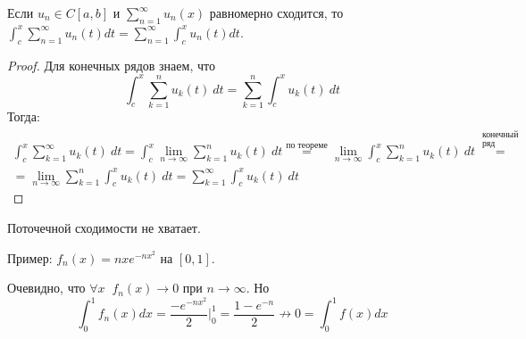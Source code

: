 \begin{follow}
    Если $u_n \in C[a, b]$ и $\sum\limits_{n=1}^\infty u_n(x)$ равномерно сходится, то $\int_c^x \sum\limits_{n=1}^\infty u_n(t) dt = \sum\limits_{n=1}^\infty \int_c^x u_n(t) dt$.
\end{follow}
\begin{proof}
  Для конечных рядов знаем, что
  \begin{equation*}
    \int_{c}^{x} \sum\limits_{k = 1}^{n} u_k(t) \: dt = \sum\limits_{k = 1}^{n} \int_{c}^{x} u_k(t) \: dt
  \end{equation*}
  Тогда:
  \begin{equation*}
    \begin{gathered}
      \int_{c}^{x} \sum\limits_{k = 1}^{\infty} u_k(t) \: dt =
      \int_{c}^{x} \lim\limits_{n \to \infty} \sum\limits_{k = 1}^{n} u_k(t) \: dt
      \overset{\text{по теореме}}{=}
      \lim\limits_{n \to \infty} \int_{c}^{x} \sum\limits_{k = 1}^{n} u_k(t) \: dt
      \overset{\substack{
        \text{конечный} \\
        \text{ряд}
      }}{=} \\
      = \lim\limits_{n \to \infty} \sum\limits_{k = 1}^{n} \int_{c}^{x} u_k(t) \: dt =
      \sum\limits_{k = 1}^{\infty} \int_{c}^{x} u_k(t) \: dt
    \end{gathered}
  \end{equation*}
\end{proof}

\begin{notice}
    Поточечной сходимости не хватает.
    
    \quad Пример: $f_n(x) = nxe^{-nx^2}$ на $[0, 1]$.

    \quad Очевидно, что $\forall x \;\; f_n(x) \to 0$ при $n \to \infty$. Но \[ \int_0^1 f_n(x)dx = \frac{-e^{-nx^2}}{2}\Big|_0^1 = \frac{1 - e^{-n}}{2} \nrightarrow 0 = \int_0^1 f(x)dx \]
\end{notice}
